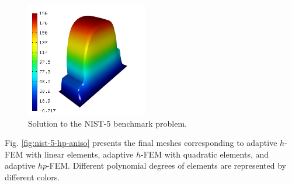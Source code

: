 \documentclass[12pt]{elsarticle}
\begin{document}
\begin{figure}[H]
\centering
\vspace{-3mm}
\includegraphics[height=5cm]{nist/nist-5/solution.png}
\vspace{-3mm}
\caption{Solution to the NIST-5 benchmark problem.}
\label{fig:sln-nist05}
\end{figure}

Fig. \ref{fig:nist-5-hp-aniso} presents the final meshes corresponding to adaptive $h$-FEM with 
linear elements, adaptive $h$-FEM with quadratic elements, and adaptive $hp$-FEM. Different 
polynomial degrees of elements are represented by different colors. 
\end{document}
